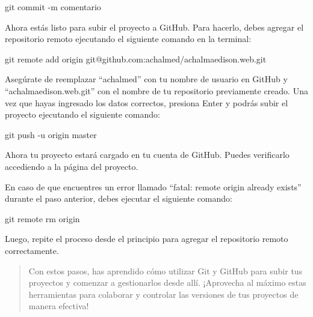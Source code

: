 \documentclass[
  letterpaper,
  DIV=11,
  numbers=noendperiod]{scrartcl}
\newenvironment{Shaded}{}{}
\newcommand{\AttributeTok}[1]{\textcolor[rgb]{0.84,0.23,0.29}{#1}}
\newcommand{\FunctionTok}[1]{\textcolor[rgb]{0.44,0.26,0.76}{#1}}
\newcommand{\NormalTok}[1]{\textcolor[rgb]{0.14,0.16,0.18}{#1}}
\newcommand{\StringTok}[1]{\textcolor[rgb]{0.01,0.18,0.38}{#1}}
\begin{document}
\begin{Shaded}
\begin{Highlighting}[]
\FunctionTok{git}\NormalTok{ commit }\AttributeTok{{-}m} \StringTok{\textquotesingle{}comentario\textquotesingle{}}
\end{Highlighting}
\end{Shaded}

Ahora estás listo para subir el proyecto a GitHub. Para hacerlo, debes
agregar el repositorio remoto ejecutando el siguiente comando en la
terminal:

\begin{Shaded}
\begin{Highlighting}[]
\FunctionTok{git}\NormalTok{ remote add origin git@github.com:achalmed/achalmaedison.web.git}
\end{Highlighting}
\end{Shaded}

Asegúrate de reemplazar ``achalmed'' con tu nombre de usuario en GitHub
y ``achalmaedison.web.git'' con el nombre de tu repositorio previamente
creado. Una vez que hayas ingresado los datos correctos, presiona Enter
y podrás subir el proyecto ejecutando el siguiente comando:

\begin{Shaded}
\begin{Highlighting}[]
\FunctionTok{git}\NormalTok{ push }\AttributeTok{{-}u}\NormalTok{ origin master}
\end{Highlighting}
\end{Shaded}

Ahora tu proyecto estará cargado en tu cuenta de GitHub. Puedes
verificarlo accediendo a la página del proyecto.

En caso de que encuentres un error llamado ``fatal: remote origin
already exists'' durante el paso anterior, debes ejecutar el siguiente
comando:

\begin{Shaded}
\begin{Highlighting}[]
\FunctionTok{git}\NormalTok{ remote rm origin}
\end{Highlighting}
\end{Shaded}

Luego, repite el proceso desde el principio para agregar el repositorio
remoto correctamente.

\begin{quote}
Con estos pasos, has aprendido cómo utilizar Git y GitHub para subir tus
proyectos y comenzar a gestionarlos desde allí. ¡Aprovecha al máximo
estas herramientas para colaborar y controlar las versiones de tus
proyectos de manera efectiva!
\end{quote}
\end{document}
